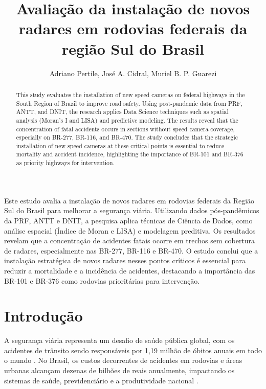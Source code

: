 \documentclass[12pt]{article}
\title{Avaliação da instalação de novos radares em rodovias federais da região Sul do Brasil}
\author{ Adriano Pertile\inst{1}, José A. Cidral\inst{2}, Muriel B. P. Guarezi\inst{3} }
\begin{document}
 

\maketitle

\begin{abstract}
  This study evaluates the installation of new speed cameras on federal highways in the South Region of Brazil to improve road safety. Using post-pandemic data from PRF, ANTT, and DNIT, the research applies Data Science techniques such as spatial analysis (Moran's I and LISA) and predictive modeling. The results reveal that the concentration of fatal accidents occurs in sections without speed camera coverage, especially on BR-277, BR-116, and BR-470. The study concludes that the strategic installation of new speed cameras at these critical points is essential to reduce mortality and accident incidence, highlighting the importance of BR-101 and BR-376 as priority highways for intervention.
\end{abstract}
     
\begin{resumo} 
  Este estudo avalia a instalação de novos radares em rodovias federais da Região Sul do Brasil para melhorar a segurança viária. Utilizando dados pós-pandêmicos da PRF, ANTT e DNIT, a pesquisa aplica técnicas de Ciência de Dados, como análise espacial (Índice de Moran e LISA) e modelagem preditiva. Os resultados revelam que a concentração de acidentes fatais ocorre em trechos sem cobertura de radares, especialmente nas BR-277, BR-116 e BR-470. O estudo conclui que a instalação estratégica de novos radares nesses pontos críticos é essencial para reduzir a mortalidade e a incidência de acidentes, destacando a importância das BR-101 e BR-376 como rodovias prioritárias para intervenção.
\end{resumo}

\section{Introdução}
A segurança viária representa um desafio de saúde pública global, com os acidentes de trânsito sendo responsáveis por 1,19 milhão de óbitos anuais em todo o mundo \cite{who2023}. 
No Brasil, os custos decorrentes de acidentes em rodovias e áreas urbanas alcançam dezenas de bilhões de reais anualmente, impactando os sistemas de saúde, previdenciário e a produtividade nacional \cite{ipea2020}. 
\end{document}
